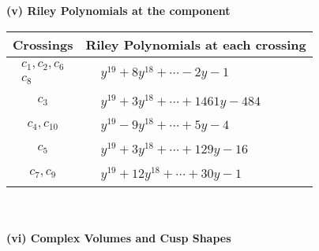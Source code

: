 \documentclass[1p]{elsarticle_modified}
\theoremstyle{definition}
\begin{document}
\flushleft \textbf{(v) Riley Polynomials at the component}\newline \\
\begin{tabular}{m{50pt}|m{274pt}}
Crossings & \hspace{64pt}Riley Polynomials at each crossing \\
\hline $$\begin{aligned}c_{1},c_{2},c_{6}\\c_{8}\end{aligned}$$&$\begin{aligned}
&y^{19}+8 y^{18}+\cdots-2 y-1
\end{aligned}$\\
\hline $$\begin{aligned}c_{3}\end{aligned}$$&$\begin{aligned}
&y^{19}+3 y^{18}+\cdots+1461 y-484
\end{aligned}$\\
\hline $$\begin{aligned}c_{4},c_{10}\end{aligned}$$&$\begin{aligned}
&y^{19}-9 y^{18}+\cdots+5 y-4
\end{aligned}$\\
\hline $$\begin{aligned}c_{5}\end{aligned}$$&$\begin{aligned}
&y^{19}+3 y^{18}+\cdots+129 y-16
\end{aligned}$\\
\hline $$\begin{aligned}c_{7},c_{9}\end{aligned}$$&$\begin{aligned}
&y^{19}+12 y^{18}+\cdots+30 y-1
\end{aligned}$\\
\hline
\end{tabular}\\~\\
\newpage\flushleft \textbf{(vi) Complex Volumes and Cusp Shapes}
\end{document}
